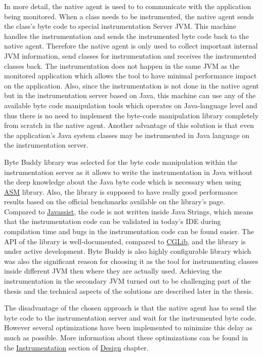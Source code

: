 In more detail, the native agent is used to to communicate with the application being monitored. When a class needs to be instrumented, the native agent sends the class's byte code to special instrumentation Server JVM. This machine handles the instrumentation and sends the instrumented byte code back to the native agent. Therefore the native agent is only used to collect important internal JVM information, send classes for instrumentation and receives the instrumented classes back. The instrumentation does not happen in the same JVM as the monitored application which allows the tool to have minimal performance impact on the application. Also, since the instrumentation is not done in the native agent  but in the instrumentation server based on Java, this machine can use any of the available byte code manipulation tools which operates on Java-language level and thus there is no need to implement the byte-code manipulation library completely from scratch in the native agent. Another advantage of this solution is that even the application's Java system classes may be instrumented in Java language on the instrumentation server.

Byte Buddy library was selected for the byte code manipulation within the instrumentation server  as it allows to write the instrumentation in Java without the deep knowledge about the Java byte code which is necessary when using \hyperref[asm]{ASM} library. Also, the library is supposed to have really good performance results based on the official benchmarks available on the library's page. Compared to \hyperref[javassist]{Javassist}, the code is not written inside Java Strings, which means that the instrumentation code can be validated in today's IDE during compilation time and bugs in the instrumentation code can be found easier. The API of the library is well-documented, compared to \hyperref[cglib]{CGLib}, and the library is under active development. Byte Buddy is also highly configurable library which was also the significant reason for choosing it as the tool for instrumenting classes inside different JVM then where they are actually used. Achieving the instrumentation in the secondary JVM  turned out to be challenging part of the thesis and the technical aspects of the solutions are described later in the thesis.

The disadvantage of the chosen approach is that the native agent has to send the byte code to the instrumentation server and wait for the instrumented byte code. However several optimizations have been implemented to minimize this delay as much as possible. More information about these optimizations can be found in the \hyperref[sec:inst_server]{Instrumentation} section of \hyperref[chap:design]{Design} chapter.
			
